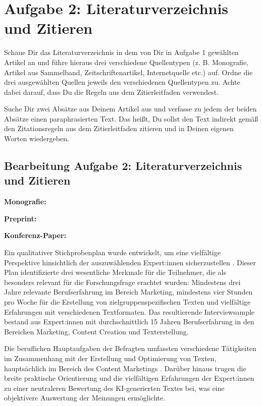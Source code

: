 \section*{Aufgabe 2: Literaturverzeichnis und Zitieren}

\begin{enumerate}
	\itshape{
	\item Schaue Dir das Literaturverzeichnis in dem von Dir in Aufgabe 1 gewählten Artikel an und führe hieraus drei verschiedene Quellentypen (z. B. Monografie, Artikel aus Sammelband, Zeitschriftenartikel, Internetquelle etc.) auf. Ordne die drei ausgewählten Quellen jeweils den verschiedenen Quellentypen zu. Achte dabei darauf, dass Du die Regeln aus dem Zitierleitfaden verwendest.
	\item Suche Dir zwei Absätze aus Deinem Artikel aus und verfasse zu jedem der beiden Absätze einen paraphrasierten Text. Das heißt, Du sollst den Text indirekt gemäß den Zitationsregeln aus dem Zitierleitfaden zitieren und in Deinen eigenen Worten wiedergeben.}
\end{enumerate}

\clearpage

\subsection*{Bearbeitung Aufgabe 2: Literaturverzeichnis und Zitieren}

\textbf{Monografie:}


\textbf{Preprint:}


\textbf{Konferenz-Paper:}



Ein qualitativer Stichprobenplan wurde entwickelt, um eine vielfältige Perspektive hinsichtlich der auszuwählenden Expert:innen sicherzustellen \parencite[S. 411]{steinmann2024}. Dieser Plan identifizierte drei wesentliche Merkmale für die Teilnehmer, die als besonders relevant für die Forschungsfrage erachtet wurden: Mindestens drei Jahre relevante Berufserfahrung im Bereich Marketing, mindestens vier Stunden pro Woche für die Erstellung von zielgruppenspezifischen Texten und vielfältige Erfahrungen mit verschiedenen Textformaten. Das resultierende Interviewsample bestand aus Expert:innen mit durchschnittlich 15 Jahren Berufserfahrung in den Bereichen Marketing, Content Creation und Texterstellung.

Die beruflichen Hauptaufgaben der Befragten umfassten verschiedene Tätigkeiten im Zusammenhang mit der Erstellung und Optimierung von Texten, hauptsächlich im Bereich des Content Marketings \parencite[S. 411]{steinmann2024}. Darüber hinaus trugen die breite praktische Orientierung und die vielfältigen Erfahrungen der Expert:innen zu einer neutraleren Bewertung des \ac{KI}-generierten Textes bei, was eine objektivere Auswertung der Meinungen ermöglichte.
